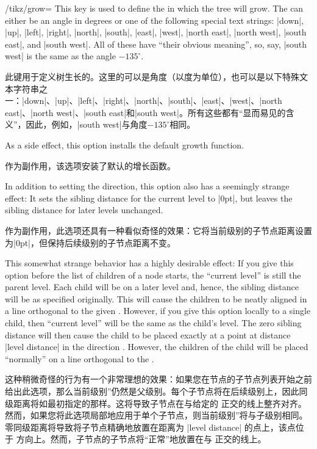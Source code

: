 \begin{key}{/tikz/grow=}
    This key is used to define the  in which the tree will
    grow. The  can either be an angle in degrees or one of the
    following special text strings: |down|, |up|, |left|, |right|, |north|,
    |south|, |east|, |west|, |north east|, |north west|, |south east|, and
    |south west|. All of these have ``their obvious meaning'', so, say,
    |south west| is the same as the angle $-135^\circ$.

    此键用于定义树生长的。这里的可以是角度（以度为单位），也可以是以下特殊文本字符串之一：|down|、|up|、|left|、|right|、|north|、|south|、|east|、|west|、|north east|、|north west|、|south east|和|south west|。所有这些都有“显而易见的含义”，因此，例如，|south west|与角度$-135^\circ$相同。

    As a side effect, this option installs the default growth function.

    作为副作用，该选项安装了默认的增长函数。



    

    In addition to setting the direction, this option also has a seemingly
    strange effect: It sets the sibling distance for the current level to
    |0pt|, but leaves the sibling distance for later levels unchanged.

    作为副作用，此选项还具有一种看似奇怪的效果：它将当前级别的子节点距离设置为|0pt|，但保持后续级别的子节点距离不变。



    This somewhat strange behavior has a highly desirable effect: If you give
    this option before the list of children of a node starts, the ``current
    level'' is still the parent level. Each child will be on a later level and,
    hence, the sibling distance will be as specified originally. This will
    cause the children to be neatly aligned in a line orthogonal to the given
    . However, if you give this option locally to a single
    child, then ``current level'' will be the same as the child's level. The
    zero sibling distance will then cause the child to be placed exactly at a
    point at distance |level distance| in the direction .
    However, the children of the child will be placed ``normally'' on a line
    orthogonal to the .

    
    这种稍微奇怪的行为有一个非常理想的效果：如果您在节点的子节点列表开始之前给出此选项，那么当前级别''仍然是父级别。每个子节点将在后续级别上，因此同级距离将如最初指定的那样。这将导致子节点在与给定的  正交的线上整齐对齐。然而，如果您将此选项局部地应用于单个子节点，则当前级别''将与子级别相同。零同级距离将导致将子节点精确地放置在距离为 |level distance| 的点上，该点位于  方向上。然而，子节点的子节点将``正常''地放置在与  正交的线上。



\end{key}

